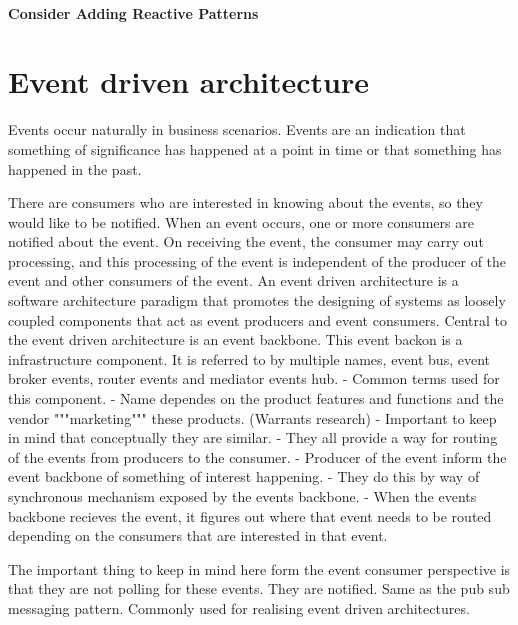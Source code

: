 \paragraph{Consider Adding Reactive Patterns}

\section{Event driven architecture}
Events occur naturally in business scenarios.
Events are an indication that something of significance has happened at a point in time or that something has happened in the past.

There are consumers who are interested in knowing about the events, so they would like to be notified.
When an event occurs, one or more consumers are notified about the event.
On receiving the event, the consumer may carry out processing, and this processing of the event is independent of the producer of the event and other consumers of the event.
An event driven architecture is a software architecture paradigm that promotes the designing of systems as loosely coupled components that act as event producers and event consumers.
Central to the event driven architecture is an event backbone.
This event backon is a infrastructure component.
It is referred to by multiple names, event bus, event broker events, router events and mediator events hub.
- Common terms used for this component.
- Name dependes on the product features and functions and the vendor """marketing""" these products. (Warrants research)
- Important to keep in mind that conceptually they are similar.
- They all provide a way for routing of the events from producers to the consumer.
- Producer of the event inform the event backbone of something of interest happening.
- They do this by way of synchronous mechanism exposed by the events backbone.
- When the events backbone recieves the event, it figures out where that event needs to be routed depending on the consumers that are interested in that event.

The important thing to keep in mind here form the event consumer perspective is that they are not polling for these events. They are notified.
Same as the pub sub messaging pattern.
Commonly used for realising event driven architectures.

